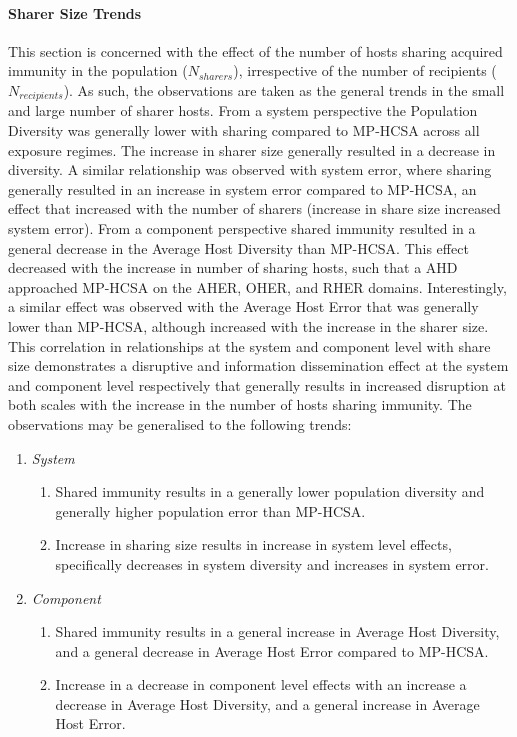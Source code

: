 %
%
\paragraph{Sharer Size Trends}
This section is concerned with the effect of the number of hosts sharing acquired immunity in the population ($N_{sharers}$), irrespective of the number of recipients ($N_{recipients}$). As such, the observations are taken as the general trends in the small and large number of sharer hosts. 
From a system perspective the Population Diversity was generally lower with sharing compared to MP-HCSA across all exposure regimes. The increase in sharer size generally resulted in a decrease in diversity. A similar relationship was observed with system error, where sharing generally resulted in an increase in system error compared to MP-HCSA, an effect that increased with the number of sharers (increase in share size increased system error). 
From a component perspective shared immunity resulted in a general decrease in the Average Host Diversity than MP-HCSA. This effect decreased with the increase in number of sharing hosts, such that a AHD approached MP-HCSA on the AHER, OHER, and RHER domains. Interestingly, a similar effect was observed with the Average Host Error that was generally lower than MP-HCSA, although increased with the increase in the sharer size. 
This correlation in relationships at the system and component level with share size demonstrates a disruptive and information dissemination effect at the system and component level respectively that generally results in increased disruption at both scales with the increase in the number of hosts sharing immunity. The observations may be generalised to the following trends: 

\begin{enumerate}
	\item \emph{System}
		\begin{enumerate}
			\item Shared immunity results in a generally lower population diversity and generally higher population error than MP-HCSA.
			\item Increase in sharing size results in increase in system level effects, specifically decreases in system diversity and increases in system error.
		\end{enumerate}

	\item \emph{Component}
		\begin{enumerate}
			\item Shared immunity results in a general increase in Average Host Diversity, and a general decrease in Average Host Error compared to MP-HCSA.
			\item Increase in a decrease in component level effects with an increase a decrease in Average Host Diversity, and a general increase in Average Host Error.
		\end{enumerate}
\end{enumerate}


